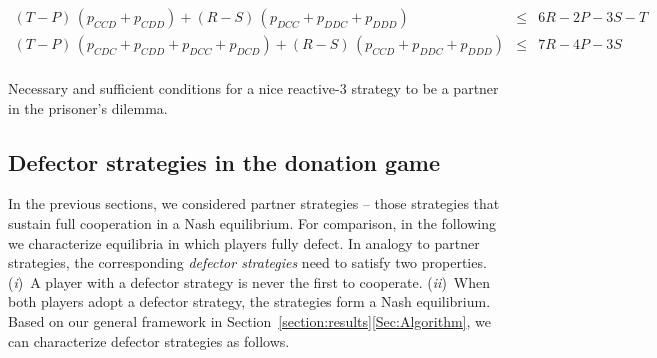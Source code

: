 \documentclass[9pt,twoside,lineno]{pnas-new}
\theoremstyle{plainCl1}
\theoremstyle{plainCl2}
\begin{document}
\begin{table}[t!]
{{\begin{equation*}
\begin{array}{rcl}
    (T - P)\,(p_{CCD} + p_{CDD}) + (R - S)\,(p_{DCC} + p_{DDC} + p_{DDD}) & \le & 6 R \!-\! 2 P \!-\! 3 S \!-\! T \\ [0.2cm]
    (T - P)\,(p_{CDC} + p_{CDD} + p_{DCC} + p_{DCD}) + (R - S)\,(p_{CCD} + p_{DDC} + p_{DDD}) & \le & 7 R \!-\! 4 P \!-\! 3 S \\ [0.2cm]
 \end{array}
 \end{equation*}
 }}
 \caption{Necessary and sufficient conditions for a nice reactive-3 strategy to be a partner in the  prisoner's dilemma.}
 \label{Tab:PartnerReactiveThreePD}
 \end{table}
 
 
 
 
 

\subsection{Defector strategies in the donation game}\label{section:defecting_donation_game}

In the previous sections, we considered partner strategies -- those strategies that sustain full cooperation in a Nash equilibrium.  
For comparison, in the following we characterize equilibria in which players fully defect. 
In analogy to partner strategies, the corresponding {\it defector strategies} need to satisfy two properties. 
({\it i})~A player with a defector strategy is never the first to cooperate. 
({\it ii})~When both players adopt a defector strategy, the strategies form a Nash equilibrium. 
Based on our general framework in Section~\ref{section:results}\ref{Sec:Algorithm}, we can characterize defector strategies as follows. 


\end{document}

